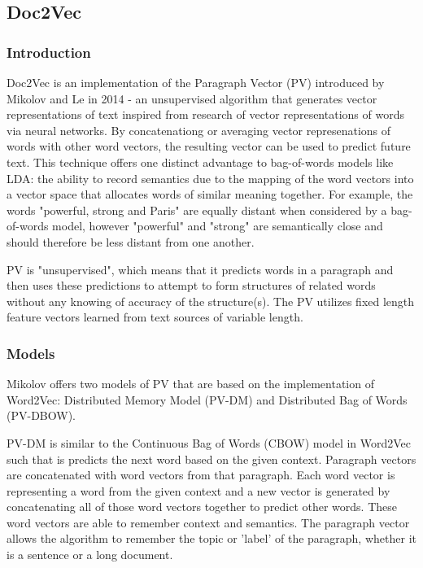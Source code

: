 \subsection{Doc2Vec}

\subsubsection{Introduction}
Doc2Vec is an implementation of the Paragraph Vector (PV) introduced by Mikolov and Le in 2014 - an unsupervised algorithm that generates vector representations of text inspired from research of vector representations of words via neural networks. \cite{RefWorks:doc:5a6e5746e4b0d609eec798d7} By concatenationg or averaging vector represenations of words with other word vectors, the resulting vector can be used to predict future text. This technique offers one distinct advantage to bag-of-words models like LDA: the ability to record semantics due to the mapping of the word vectors into a vector space that allocates words of similar meaning together. For example, the words "powerful, strong and Paris" are equally distant when considered by a bag-of-words model, however "powerful" and "strong" are semantically close and should therefore be less distant from one another. \cite{RefWorks:doc:5a6e5746e4b0d609eec798d7}
	
PV is "unsupervised", which means that it predicts words in a paragraph and then uses these predictions to attempt to form structures of related words without any knowing of accuracy of the structure(s). The PV utilizes fixed length feature vectors learned from text sources of variable length. 


\subsubsection{Models}
Mikolov offers two models of PV that are based on the implementation of Word2Vec: Distributed Memory Model (PV-DM) and Distributed Bag of Words (PV-DBOW). 

PV-DM is similar to the Continuous Bag of Words (CBOW) model in Word2Vec such that is predicts the next word based on the given context. Paragraph vectors are concatenated with word vectors from that paragraph.  Each word vector is representing a word from the given context and a new vector is generated by concatenating all of those word vectors together to predict other words. These word vectors are able to remember context and semantics. The paragraph vector allows the algorithm to remember the topic or 'label' of the paragraph, whether it is a sentence or a long document. 

